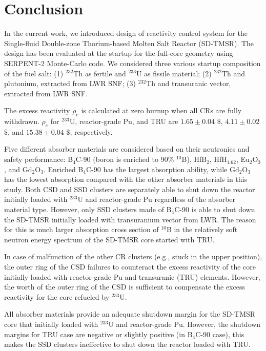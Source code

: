 \section{Conclusion} \label{Conclusion}
In the current work, we introduced design of reactivity control system for the 
Single-fluid Double-zone Thorium-based Molten Salt Reactor (SD-TMSR). The 
design has been evaluated at the startup for the full-core geometry using 
SERPENT-2 Monte-Carlo code. We considered three various startup composition of 
the fuel salt: (1) $^{232}$Th as fertile and $^{233}$U as fissile material; 
(2) $^{232}$Th and plutonium, extracted from \gls{LWR} \gls{SNF}; (3) 
$^{232}$Th and transuranic vector, extracted from \gls{LWR} \gls{SNF}.

The excess reactivity $\rho_e$ is calculated at zero burnup when all CRs are 
fully withdrawn. $\rho_e$ for $^{233}$U, reactor-grade Pu, and 
TRU are $1.65\pm0.04$ $\$$, $4.11\pm0.02$ $\$$, and $15.38\pm0.04$ $\$$, 
respectively.

Five different absorber materials are considered based on their neutronics and 
safety performance: B$_4$C-90 (boron is enriched to 90\% $^{10}$B), HfB$_2$, 
HfH$_{1.62}$, Eu$_2$O$_3$, and Gd$_2$O$_3$. Enriched B$_4$C-90 has the largest 
absorption ability, while Gd$_2$O$_3$ has the lowest absorption compared with 
the other absorber materials in this study. Both CSD and SSD clusters are 
separately able to shut down the reactor initially loaded with $^{233}$U and 
reactor-grade Pu regardless of the absorber material type. However, only SSD 
clusters made of B$_4$C-90 is able to shut down the SD-TMSR initially loaded 
with transuranium vector from \gls{LWR}. The reason for this is much larger 
absorption cross section of $^{10}$B in the relatively soft neutron energy 
spectrum of the SD-TMSR core started with TRU.

In case of malfunction of the other CR clusters (e.g., stuck in the upper 
position), the outer ring of the CSD failures to counteract the excess 
reactivity of the core initially loaded with reactor-grade Pu and transuranic 
(TRU) elements. However, the worth of the outer ring of the CSD is sufficient 
to compensate the excess reactivity for the core refueled by $^{233}$U.

All absorber materials provide an adequate shutdown margin for the SD-TMSR 
core that initially loaded with $^{233}$U and reactor-grade Pu. However, the 
shutdown margins for TRU case are negative or slightly positive (in B$_4$C-90 
case), this makes the SSD clusters ineffective to shut down the reactor loaded 
with TRU.

